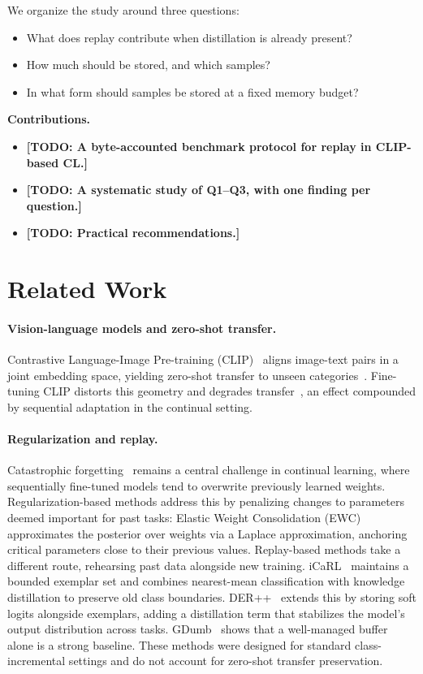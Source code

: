 \documentclass[10pt,twocolumn,letterpaper]{article}
\newcommand{\TODO}[1]{\textbf{\color{red}[TODO: #1]}}
\newcommand{\Q}[1]{\textbf{Q#1}\xspace}     %
\begin{document}
We organize the study around three questions:
\begin{itemize}[leftmargin=*,itemsep=2pt]
  \item[\Q{1}] What does replay contribute when distillation is already present?
  \item[\Q{2}] How much should be stored, and which samples?
  \item[\Q{3}] In what form should samples be stored at a fixed memory budget?
\end{itemize}

\noindent\textbf{Contributions.}
\begin{itemize}
  \item \TODO{A byte-accounted benchmark protocol for replay in CLIP-based CL.}
  \item \TODO{A systematic study of \Q{1}--\Q{3}, with one finding per question.}
  \item \TODO{Practical recommendations.}
\end{itemize}

\section{Related Work}
\label{sec:related}

\paragraph{Vision-language models and zero-shot transfer.}
Contrastive Language-Image Pre-training (CLIP)~\cite{radford2021clip} aligns image-text pairs in a joint embedding space, yielding zero-shot transfer to unseen categories~\cite{lampert2009learning}. Fine-tuning CLIP distorts this geometry and degrades transfer~\cite{wortsman2022wiseft}, an effect compounded by sequential adaptation in the continual setting.

\paragraph{Regularization and replay.}
Catastrophic forgetting~\cite{mccloskey1989catastrophic} remains a central challenge in continual learning, where sequentially fine-tuned models tend to overwrite previously learned weights. Regularization-based methods address this by penalizing changes to parameters deemed important for past tasks: Elastic Weight Consolidation (EWC)~\cite{kirkpatrick2017ewc} approximates the posterior over weights via a Laplace approximation, anchoring critical parameters close to their previous values. Replay-based methods take a different route, rehearsing past data alongside new training. iCaRL~\cite{rebuffi2017icarl} maintains a bounded exemplar set and combines nearest-mean classification with knowledge distillation to preserve old class boundaries. DER++~\cite{buzzega2020der} extends this by storing soft logits alongside exemplars, adding a distillation term that stabilizes the model's output distribution across tasks. GDumb~\cite{prabhu2020gdumb} shows that a well-managed buffer alone is a strong baseline. These methods were designed for standard class-incremental settings and do not account for zero-shot transfer preservation.
\end{document}
